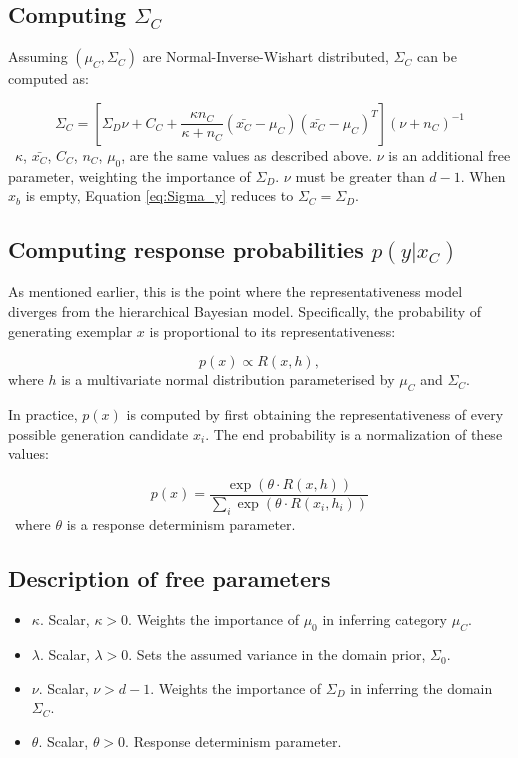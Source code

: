 \documentclass[12pt]{article}
\begin{document}
\subsection*{Computing $\Sigma_C$}

Assuming $(\mu_C, \Sigma_C)$ are Normal-Inverse-Wishart distributed, $\Sigma_C$ can be computed as:

\begin{equation}
  \Sigma_C = [\Sigma_D\nu + C_C +
    \dfrac
    {\kappa n_C}
    {\kappa + n_C}
    (\bar{x_C}-\mu_C)(\bar{x_C}-\mu_C)^T
  ] (\nu + n_C)^{-1}
  \label{eq:Sigma_y}
\end{equation}
\
$\kappa$, $\bar{x_C}$, $C_C$, $n_C$, $\mu_0$,  are the same values as described above. $\nu$ is an additional free parameter, weighting the importance of $\Sigma_{D}$. $\nu$ must be greater than $d-1$. When $x_b$ is empty, Equation \ref{eq:Sigma_y} reduces to $\Sigma_C = \Sigma_D$.

\subsection*{Computing response probabilities $p(y | x_C)$}

As mentioned earlier, this is the point where the representativeness model
diverges from the hierarchical Bayesian model. Specifically, the probability of
generating exemplar $x$ is proportional to its representativeness:

\begin{equation}
  p(x) \propto R(x,h) ,
\end{equation}
where $h$ is a multivariate normal distribution parameterised by $\mu_{C}$ and
$\Sigma_{C}$.
 
In practice, $p(x)$ is computed by first obtaining the representativeness of
every possible generation candidate $x_i$. The end probability is a
normalization of these values:

\begin{equation}
  p(x) = \dfrac
    {\exp( \theta \cdot R(x,h))}
    {\sum_i \exp( \theta \cdot R(x_i,h_i))} 
\end{equation}
\
where $\theta$ is a response determinism parameter.

\subsection*{Description of free parameters}

\begin{itemize}
    \setlength\itemsep{-0.5em}
    \item $\kappa$. Scalar, $\kappa>0$. Weights the importance of $\mu_{0}$ in inferring category $\mu_{C}$.
    \item $\lambda$. Scalar, $\lambda>0$. Sets the assumed variance in the domain prior, $\Sigma_{0}$.
    \item $\nu$. Scalar, $\nu > d-1$. Weights the importance of $\Sigma_{D}$ in inferring the domain $\Sigma_{C}$.
    \item $\theta$. Scalar, $\theta > 0$. Response determinism parameter.
\end{itemize}
\end{document}
